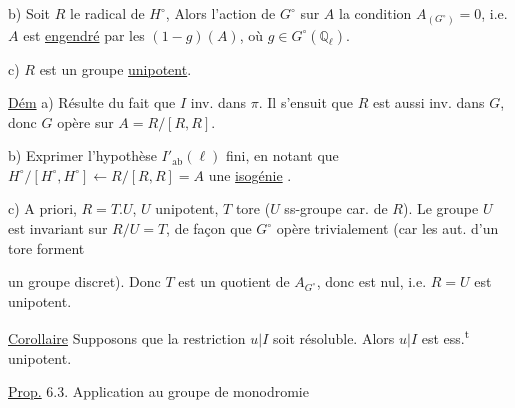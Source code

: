  b)  Soit $R$ le radical de $H^\circ$,  Alors l'action de $G^\circ$ sur $A$    la condition $A_{(G^\circ)}=0$, i.e. $A$ est  \uline{engendré} par les $(1-g)(A)$, où $g\in G^\circ(\mathbb Q_\ell)$.

 c) $R$ est un groupe \uline{unipotent}.

\uline{Dém} a) Résulte  du fait que $I$ inv. dans $\pi$. Il s'ensuit que $R$ est aussi inv. dans $G$, donc $G$ opère sur $A=R/[R,R]$.

 b) Exprimer l'hypothèse $I'_{\mathrm{ab}}(\ell)$ fini, en notant que $H^\circ/[H^\circ,H^\circ]\longleftarrow R/[R,R]=A$  une \uline{isogénie} .

 c) A priori, $R=T.U$, $U$ unipotent, $T$ tore ($U$ ss-groupe car. de $R$).  Le groupe $U$ est invariant  sur $R/U=T$, de façon que $G^\circ$ opère trivialement (car les aut. d'un tore forment

un groupe discret). Donc $T$ est un quotient de $A_{G^\circ}$, donc est nul, i.e. $R=U$ est unipotent.

\uline{Corollaire}  Supposons que la restriction $u|I$ soit  résoluble. Alors  $u|I$ est ess.\textsuperscript{t} unipotent.

\uline{Prop.} 6.3. Application au groupe de monodromie 
